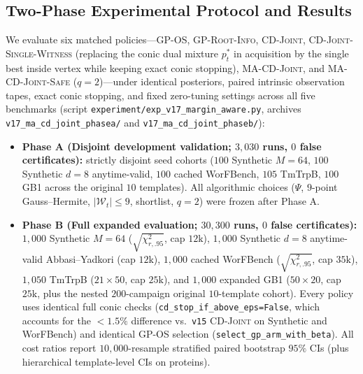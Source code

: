 \documentclass{article}
\theoremstyle{plain}
\theoremstyle{definition}
\begin{document}
\subsection{Two-Phase Experimental Protocol and Results}
\label{app:ma-results}

We evaluate six matched policies---\textsc{GP-OS}, \textsc{GP-Root-Info}, \textsc{CD-Joint}, \textsc{CD-Joint-Single-Witness} (replacing the conic dual mixture $p_t^*$ in acquisition by the single best inside vertex while keeping exact conic stopping), \textsc{MA-CD-Joint}, and \textsc{MA-CD-Joint-Safe} ($q=2$)---under identical posteriors, paired intrinsic observation tapes, exact conic stopping, and fixed zero-tuning settings across all five benchmarks (script \texttt{experiment/exp\_v17\_margin\_aware.py}, archives \texttt{v17\_ma\_cd\_joint\_phasea/} and \texttt{v17\_ma\_cd\_joint\_phaseb/}):
\begin{itemize}[leftmargin=1.6em]
  \item \textbf{Phase A (Disjoint development validation; $3{,}030$ runs, $0$ false certificates):} strictly disjoint seed cohorts ($100$ Synthetic $M=64$, $100$ Synthetic $d=8$ anytime-valid, $100$ cached WorFBench, $105$ TmTrpB, $100$ GB1 across the original $10$ templates). All algorithmic choices ($\Psi$, $9$-point Gauss--Hermite, $|\mathcal{W}_t| \le 9$, shortlist, $q=2$) were frozen after Phase A.
  \item \textbf{Phase B (Full expanded evaluation; $30{,}300$ runs, $0$ false certificates):} $1{,}000$ Synthetic $M=64$ ($\sqrt{\chi^2_{r,.95}}$, cap $12\mathrm{k}$), $1{,}000$ Synthetic $d=8$ anytime-valid Abbasi--Yadkori (cap $12\mathrm{k}$), $1{,}000$ cached WorFBench ($\sqrt{\chi^2_{r,.95}}$, cap $35\mathrm{k}$), $1{,}050$ TmTrpB ($21 \times 50$, cap $25\mathrm{k}$), and $1{,}000$ expanded GB1 ($50 \times 20$, cap $25\mathrm{k}$, plus the nested $200$-campaign original $10$-template cohort). Every policy uses identical full conic checks (\texttt{cd\_stop\_if\_above\_eps=False}, which accounts for the $<1.5\%$ difference vs.\ \texttt{v15} \textsc{CD-Joint} on Synthetic and WorFBench) and identical \textsc{GP-OS} selection (\texttt{select\_gp\_arm\_with\_beta}). All cost ratios report $10{,}000$-resample stratified paired bootstrap $95\%$ CIs (plus hierarchical template-level CIs on proteins).
\end{itemize}
\end{document}
